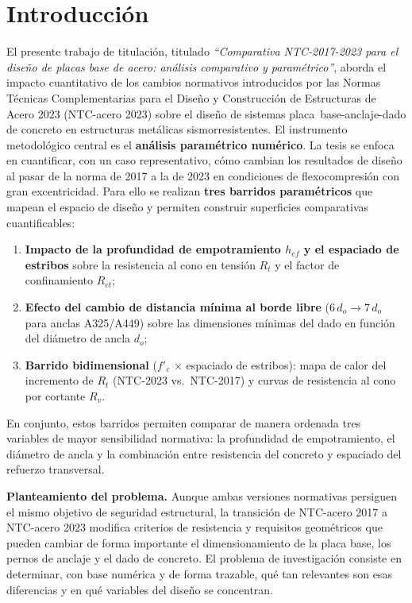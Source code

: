 \chapter{Introducción}

El presente trabajo de titulación, titulado \textit{``Comparativa NTC-2017-2023 para el diseño
de placas base de acero: análisis comparativo y paramétrico''}, aborda el impacto cuantitativo
de los cambios normativos introducidos por las Normas Técnicas Complementarias para el Diseño y
Construcción de Estructuras de Acero 2023 (NTC-acero 2023) sobre el diseño de sistemas
placa~base-anclaje-dado de concreto en estructuras metálicas sismorresistentes. El instrumento
metodológico central es el \textbf{análisis paramétrico numérico}. La tesis se enfoca en
cuantificar, con un caso representativo, cómo cambian los resultados de diseño al pasar de la
norma de 2017 a la de 2023 en condiciones de flexocompresión con gran excentricidad. Para ello
se realizan \textbf{tres barridos paramétricos} que mapean el espacio de diseño y permiten
construir superficies comparativas cuantificables:

{\renewcommand{\labelenumi}{(\arabic{enumi})}
\begin{enumerate}
  \item \textbf{Impacto de la profundidad de empotramiento $h_{ef}$ y el espaciado de estribos}
    sobre la resistencia al cono en tensión $R_t$ y el factor de confinamiento $R_{et}$;
  \item \textbf{Efecto del cambio de distancia mínima al borde libre} ($6\,d_o \to 7\,d_o$ para
    anclas A325/A449) sobre las dimensiones mínimas del dado en función del diámetro de ancla
    $d_o$;
  \item \textbf{Barrido bidimensional} ($f'_c$ $\times$ espaciado de estribos): mapa de calor del
    incremento de $R_t$ (NTC-2023 vs.\ NTC-2017) y curvas de resistencia al cono por cortante $R_v$.
\end{enumerate}}

En conjunto, estos barridos permiten comparar de manera ordenada tres variables de mayor
sensibilidad normativa: la profundidad de empotramiento, el diámetro de ancla y la combinación
entre resistencia del concreto y espaciado del refuerzo transversal.

\textbf{Planteamiento del problema.} Aunque ambas versiones normativas persiguen el mismo
objetivo de seguridad estructural, la transición de NTC-acero 2017 a NTC-acero 2023 modifica
criterios de resistencia y requisitos geométricos que pueden cambiar de forma importante el
dimensionamiento de la placa base, los pernos de anclaje y el dado de concreto. El
problema de investigación consiste en determinar, con base numérica y de forma trazable, qué tan
relevantes son esas diferencias y en qué variables del diseño se concentran.

